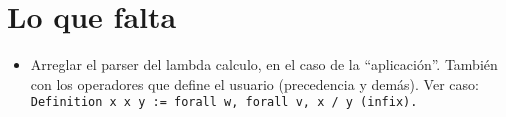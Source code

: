 \documentclass[a4paper,11pt]{article}
\begin{document}
\section{Lo que falta}
\begin{itemize}
  \item Arreglar el parser del lambda calculo, en el caso de la ``aplicación''. También con los operadores que define el usuario (precedencia y demás).
  Ver caso: \texttt{Definition x x y := forall w, forall v, x /\ y (infix).}
\end{itemize}
\end{document}

